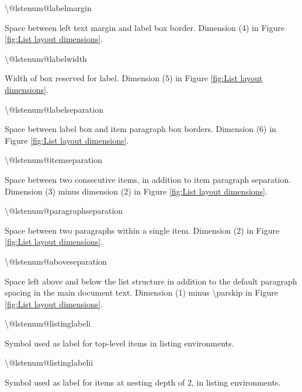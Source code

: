 \documentclass[twoside,openany]{thesis}
\begin{document}
\begin{listing}

\item   {\ttfamily\textbackslash @lstenum@labelmargin}

        Space between left text margin and label box border.
        Dimension (4) in Figure \ref{fig:List layout dimensions}.

\item   {\ttfamily\textbackslash @lstenum@labelwidth}

        Width of box reserved for label.
        Dimension (5) in Figure \ref{fig:List layout dimensions}.

\item   {\ttfamily\textbackslash @lstenum@labelseparation}

        Space between label box and item paragraph box borders.
        Dimension (6) in Figure \ref{fig:List layout dimensions}.

\item   {\ttfamily\textbackslash @lstenum@itemseparation}

        Space between two consecutive items, in addition to item paragraph separation.
        Dimension (3) minus dimension (2) in Figure \ref{fig:List layout dimensions}.

\item   {\ttfamily\textbackslash @lstenum@paragraphseparation}

        Space between two paragraphs within a single item.
        Dimension (2) in Figure \ref{fig:List layout dimensions}.

\item   {\ttfamily\textbackslash @lstenum@aboveseparation}

        Space left above and below the list structure in addition to the default paragraph spacing in the main document text.
        Dimension (1) minus {\ttfamily\textbackslash parskip} in Figure \ref{fig:List layout dimensions}.

\item   {\ttfamily\textbackslash @lstenum@listinglabeli}

        Symbol used as label for top-level items in {\ttfamily listing} environments.

\item   {\ttfamily\textbackslash @lstenum@listinglabelii}

        Symbol used as label for items at nesting depth of 2, in {\ttfamily listing} environments.


\end{listing}
\end{document}
